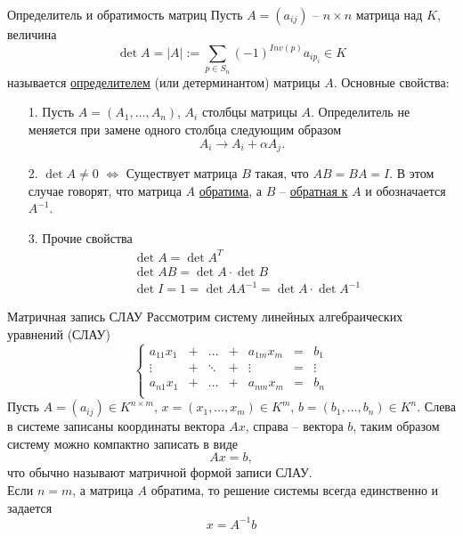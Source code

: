 \documentclass[10pt, handout]{beamer}
\begin{document}
\begin{frame}{Определитель и обратимость матриц}
Пусть $A=(a_{ij})$ -- $n\times n$ матрица над $K$, величина
$$
\det A = |A|:=\sum_{p\in S_n}(-1)^{Inv(p)}a_{ip_i}\in K
$$
называется \underline{определителем} (или детерминантом) матрицы $A$. Основные свойства:
\begin{itemize}
\item[1.] Пусть $A=(A_1, \ldots, A_n)$, $A_i$ столбцы матрицы $A$. Определитель не меняется при замене одного столбца следующим образом
$$
A_i\rightarrow A_i+\alpha A_j.
$$
\item[2.] $\det A\neq 0$ $\Leftrightarrow$ Существует матрица $B$ такая, что $AB=BA=I$. В этом случае говорят, что матрица $A$ \underline{обратима}, а $B$ -- \underline{обратная к} $A$ и обозначается $A^{-1}$.
\item[3.] Прочие свойства
\begin{align*}
&\det A=\det A^T\\
&\det AB=\det A\cdot \det B\\
&\det I=1=\det AA^{-1}=\det A\cdot \det A^{-1}
\end{align*}
\end{itemize}
\end{frame}

\begin{frame}{Матричная запись СЛАУ}
Рассмотрим систему линейных алгебраических уравнений (СЛАУ)
$$
\left\{
\begin{array}{lllllll}
a_{11} x_1 & + & \ldots & +&a_{1m}x_m&=&b_1\\
\vdots & + & \ddots & + &\vdots&=&\vdots\\
a_{n1}x_1& + & \ldots & +&a_{nm}x_m&=&b_n\\
\end{array}
\right.
$$
\pause
Пусть $A=(a_{ij})\in K^{n\times m}$, $x=(x_1, \ldots, x_m)\in K^m$, $b=(b_1, \ldots, b_n)\in K^n$. Слева в системе записаны координаты вектора $Ax$, справа -- вектора $b$, таким образом систему можно компактно записать в виде
$$
Ax=b,
$$
что обычно называют матричной формой записи СЛАУ.\\
\vspace{1em}
\pause
Если $n=m$, а матрица $A$ обратима, то решение системы всегда единственно и задается
$$
x=A^{-1}b
$$ 

\end{frame}
\end{document}
